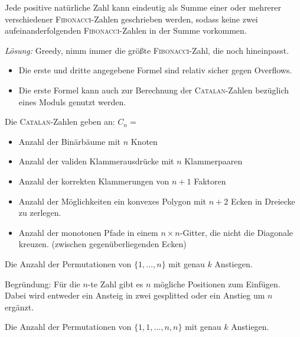 \begin{bem}\label{bem:fibonacciGreedy}
Jede positive natürliche Zahl kann eindeutig als Summe einer oder mehrerer verschiedener \textsc{Fibonacci}-Zahlen geschrieben werden, sodass keine zwei aufeinanderfolgenden \textsc{Fibonacci}-Zahlen in der Summe vorkommen.

\emph{Lösung: } Greedy, nimm immer die größte \textsc{Fibonacci}-Zahl, die noch hineinpasst.
\end{bem}

\begin{bem}\label{bem:catalanOverflow}
\begin{itemize}
	\item Die erste und dritte angegebene Formel sind relativ sicher gegen Overflows.
	\item Die erste Formel kann auch zur Berechnung der \textsc{Catalan}-Zahlen bezüglich eines Moduls genutzt werden.
\end{itemize}
\end{bem}

\begin{bem}\label{bem:catalanAnwendung}
Die \textsc{Catalan}-Zahlen geben an: $C_n =$
\begin{itemize}
	\item Anzahl der Binärbäume mit $n$ Knoten
	\item Anzahl der validen Klammerausdrücke mit $n$ Klammerpaaren
	\item Anzahl der korrekten Klammerungen von $n+1$ Faktoren
	\item Anzahl der Möglichkeiten ein konvexes Polygon mit $n+2$ Ecken in Dreiecke zu zerlegen.
	\item Anzahl der monotonen Pfade in einem $n \times n$-Gitter, die nicht die Diagonale kreuzen. (zwischen gegenüberliegenden Ecken)
\end{itemize}
\end{bem}

\begin{bem}\label{bem:euler1}
Die Anzahl der Permutationen von $\{1, \ldots, n\}$ mit genau $k$ Anstiegen.

Begründung: Für die $n$-te Zahl gibt es $n$ mögliche Positionen zum Einfügen. Dabei wird entweder ein Ansteig in zwei gesplitted oder ein Anstieg um $n$ ergänzt.
\end{bem}

\begin{bem}\label{bem:euler2}
Die Anzahl der Permutationen von $\{1,1, \ldots, n,n\}$ mit genau $k$ Anstiegen.
\end{bem}

